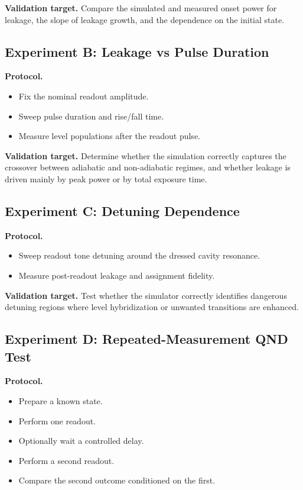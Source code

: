 \documentclass[11pt]{article}
\begin{document}
\textbf{Validation target.}
Compare the simulated and measured onset power for leakage, the slope of leakage growth,
and the dependence on the initial state.

\subsection{Experiment B: Leakage vs Pulse Duration}

\textbf{Protocol.}
\begin{itemize}[leftmargin=2em]
    \item Fix the nominal readout amplitude.
    \item Sweep pulse duration and rise/fall time.
    \item Measure level populations after the readout pulse.
\end{itemize}

\textbf{Validation target.}
Determine whether the simulation correctly captures the crossover between adiabatic and
non-adiabatic regimes, and whether leakage is driven mainly by peak power or by total
exposure time.

\subsection{Experiment C: Detuning Dependence}

\textbf{Protocol.}
\begin{itemize}[leftmargin=2em]
    \item Sweep readout tone detuning around the dressed cavity resonance.
    \item Measure post-readout leakage and assignment fidelity.
\end{itemize}

\textbf{Validation target.}
Test whether the simulator correctly identifies dangerous detuning regions where level
hybridization or unwanted transitions are enhanced.

\subsection{Experiment D: Repeated-Measurement QND Test}

\textbf{Protocol.}
\begin{itemize}[leftmargin=2em]
    \item Prepare a known state.
    \item Perform one readout.
    \item Optionally wait a controlled delay.
    \item Perform a second readout.
    \item Compare the second outcome conditioned on the first.
\end{itemize}
\end{document}
